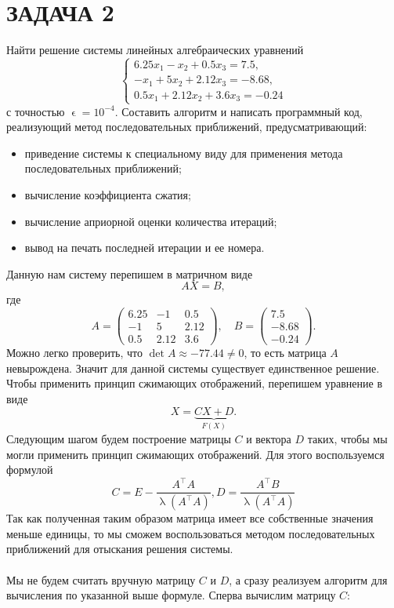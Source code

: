 \documentclass[a4paper, 12pt]{report}
\renewcommand{\lambda}{\uplambda}
\renewcommand{\epsilon}{\upvarepsilon}
\begin{document}
	\section*{ЗАДАЧА 2}
	Найти решение системы линейных алгебраических уравнений $$\begin{cases}
	6.25x_1 - x_2 + 0.5x_3 = 7.5,\\
	-x_1 + 5x_2 + 2.12x_3 = -8.68,\\
	0.5x_1 + 2.12x_2 + 3.6x_3 = -0.24
	\end{cases}$$ с точностью $\epsilon=10^{-4}$. Составить алгоритм и написать программный код, реализующий метод последовательных приближений, предусматривающий:
	\begin{itemize}
		\item приведение системы к специальному виду для применения метода последовательных приближений;
		\item вычисление коэффициента сжатия;
		\item вычисление априорной оценки количества итераций;
		\item вывод на печать последней итерации и ее номера.
	\end{itemize}
	Данную нам систему перепишем в матричном виде $$AX = B,$$ где $$A = \begin{pmatrix}
	6.25 & -1 & 0.5\\
	-1 & 5 & 2.12\\
	0.5 & 2.12 & 3.6
	\end{pmatrix},\quad B = \begin{pmatrix}
	7.5 \\ -8.68 \\ -0.24
	\end{pmatrix}.$$
	Можно легко проверить, что $\det A \approx -77.44 \ne 0$, то есть матрица $A$ невырождена. Значит для данной системы существует единственное решение. Чтобы применить принцип сжимающих отображений, перепишем уравнение в виде $$X = \underbrace{CX + D}_{F(X)}.$$
	Следующим шагом будем построение матрицы $C$ и вектора $D$ таких, чтобы мы могли применить принцип сжимающих отображений. Для этого воспользуемся формулой $$
	C=E-\frac{A^{\top} A}{\lambda\left(A^{\top} A\right)}, D=\frac{A^{\top} B}{\lambda\left(A^{\top} A\right)}
	$$
	Так как полученная таким образом матрица имеет все собственные значения меньше единицы, то мы сможем воспользоваться методом последовательных приближений для отыскания решения системы.\\\\
	Мы не будем считать вручную матрицу $C$ и $D$, а сразу реализуем алгоритм для вычисления по указанной выше формуле. Сперва вычислим матрицу $C$:
\end{document}

